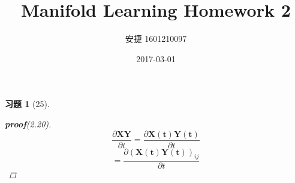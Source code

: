 \documentclass[a4paper, UTF8]{ctexart}
\title{Manifold Learning Homework 2}
\date{2017-03-01}
\author{安捷 1601210097}
\newtheorem*{exercise}{\textbf{习题}}
\begin{document}
\maketitle
  \begin{exercise}[25]
    \begin{proof}[\textbf{proof}(2.20)]
      \begin{equation*}
        \frac{\partial \mathbf{XY}}{\partial t} = \frac{\partial \mathbf{X \left(t\right)}\mathbf{Y \left(t\right)}}{\partial t}
      \end{equation*}
      \begin{equation*}
        = \frac{ \partial \left( \mathbf{X \left( t \right) Y \left( t \right)} \right)_{ij} }{\partial t}
      \end{equation*}
    \end{proof}
  \end{exercise}
\end{document}
